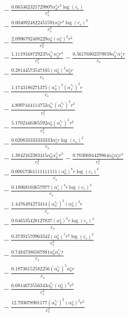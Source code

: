 \documentclass[10pt]{article}
\begin{document}
\begin{align*}
&{}  - \frac{0.065362321729807 \alpha_{3}^s r^{3} \log{\left(c_{s} \right)}}{c_{s}^{3}} \\
&{}  - \frac{0.0040924822451591 \alpha_{3}^s r^{3} \log{\left(c_{s} \right)}^{3}}{c_{s}^{3}} \\
&{}  - \frac{2.0996792408229 \alpha_{0}^s \left(\alpha_{1}^s\right)^{2} r^{2}}{c_{s}^{2}} \\
&{}  - \frac{1.1119348729237 \alpha_{0}^{c_s} \alpha_{2}^s r^{3}}{c_{s}^{3}} - \frac{0.56176802379859 \alpha_{0}^{c_s} \alpha_{4}^s r}{c_{s}} \\
&{}  - \frac{0.28144573547165 \left(\alpha_{0}^s\right)^{3} \alpha_{2}^s r}{c_{s}} \\
&{}  - \frac{1.1743186271375 \left(\alpha_{0}^s\right)^{2} \left(\alpha_{1}^{c_s}\right)^{2} r}{c_{s}} \\
&{}  - \frac{4.8007444114752 \alpha_{0}^{c_s} \left(\alpha_{1}^{c_s}\right)^{2} r^{2}}{c_{s}^{2}} \\
&{}  - \frac{5.1702446365592 \alpha_{0}^s \left(\alpha_{1}^{c_s}\right)^{2} r^{2}}{c_{s}^{2}} \\
&{}  - \frac{0.020833333333333 \alpha_{5}^s r \log{\left(c_{s} \right)}^{3}}{c_{s}} \\
&{}  - \frac{1.3842162383415 \alpha_{0}^s \alpha_{2}^{c_s} r^{3}}{c_{s}^{3}} - \frac{0.7030684429864 \alpha_{0}^s \alpha_{2}^s r^{3}}{c_{s}^{3}} \\
&{}  - \frac{0.00017361111111111 \left(\alpha_{0}^s\right)^{6} r \log{\left(c_{s} \right)}^{6}}{c_{s}} \\
&{}  - \frac{0.18068103657977 \left(\alpha_{1}^s\right)^{3} r \log{\left(c_{s} \right)}^{3}}{c_{s}} \\
&{}  - \frac{1.4476494273414 \left(\alpha_{0}^{c_s}\right)^{3} \left(\alpha_{0}^s\right)^{3} r}{c_{s}} \\
&{}  - \frac{0.046535428127837 \left(\alpha_{2}^s\right)^{2} r \log{\left(c_{s} \right)}^{4}}{c_{s}} \\
&{}  - \frac{0.37391570963342 \left(\alpha_{0}^s\right)^{5} r^{2} \log{\left(c_{s} \right)}^{2}}{c_{s}^{2}} \\
&{}  - \frac{0.74847386567881 \alpha_{0}^s \alpha_{4}^{c_s} r}{c_{s}} \\
&{}  - \frac{0.18736152582256 \left(\alpha_{0}^{c_s}\right)^{5} \alpha_{0}^s r}{c_{s}} \\
&{}  - \frac{6.0814673556343 \alpha_{0}^{c_s} \left(\alpha_{0}^s\right)^{3} r^{3}}{c_{s}^{3}} \\
&{}  - \frac{12.793078901177 \left(\alpha_{0}^{c_s}\right)^{2} \left(\alpha_{0}^s\right)^{2} r^{3}}{c_{s}^{3}} \\

\end{align*}
\end{document}
